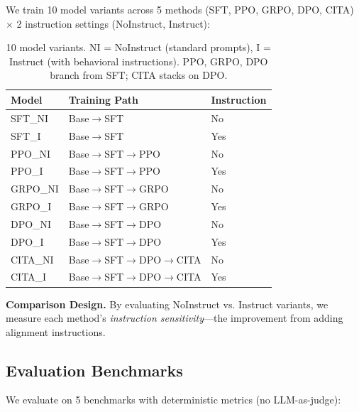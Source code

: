 We train 10 model variants across 5 methods (SFT, PPO, GRPO, DPO, CITA) $\times$ 2 instruction settings (NoInstruct, Instruct):

\begin{table}[H]
\centering
\footnotesize
\begin{tabular}{@{}lll@{}}
\toprule
\textbf{Model} & \textbf{Training Path} & \textbf{Instruction} \\
\midrule
SFT\_NI & Base$\rightarrow$SFT & No \\
\hline
SFT\_I & Base$\rightarrow$SFT & Yes \\
\hline
PPO\_NI & Base$\rightarrow$SFT$\rightarrow$PPO & No \\
\hline
PPO\_I & Base$\rightarrow$SFT$\rightarrow$PPO & Yes \\
\hline
GRPO\_NI & Base$\rightarrow$SFT$\rightarrow$GRPO & No \\
\hline
GRPO\_I & Base$\rightarrow$SFT$\rightarrow$GRPO & Yes \\
\hline
DPO\_NI & Base$\rightarrow$SFT$\rightarrow$DPO & No \\
\hline
DPO\_I & Base$\rightarrow$SFT$\rightarrow$DPO & Yes \\
\hline
CITA\_NI & Base$\rightarrow$SFT$\rightarrow$DPO$\rightarrow$CITA & No \\
\hline
CITA\_I & Base$\rightarrow$SFT$\rightarrow$DPO$\rightarrow$CITA & Yes \\
\bottomrule
\end{tabular}
\caption{10 model variants. NI = NoInstruct (standard prompts), I = Instruct (with behavioral instructions). PPO, GRPO, DPO branch from SFT; CITA stacks on DPO.}
\label{tab:model_variants}
\vspace{-4mm}
\end{table}

\textbf{Comparison Design.} By evaluating NoInstruct vs. Instruct variants, we measure each method's \textit{instruction sensitivity}---the improvement from adding alignment instructions.

\vspace{-2mm}
\subsection{Evaluation Benchmarks}
\label{sec:benchmarks}

We evaluate on 5 benchmarks with deterministic metrics (no LLM-as-judge):

